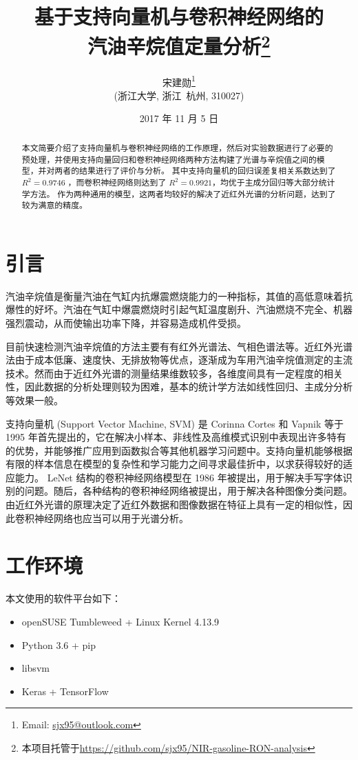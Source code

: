 \documentclass[a4paper]{article}
\title{基于支持向量机与卷积神经网络的\\汽油辛烷值定量分析\footnote{本项目托管于\url{https://github.com/sjx95/NIR-gasoline-RON-analysis}}}
\author{宋建勋\thanks{Email: \href{mailto:sjx95@outlook.com}{sjx95@outlook.com}} \\ \small(浙江大学, 浙江~杭州, 310027)}
\date{\small 2017 年 11 月 5 日}
\begin{document}
	\maketitle
	
	\begin{abstract}
		本文简要介绍了支持向量机与卷积神经网络的工作原理，然后对实验数据进行了必要的预处理，并使用支持向量回归和卷积神经网络两种方法构建了光谱与辛烷值之间的模型，并对两者的结果进行了评价与分析。
		其中支持向量机的回归误差复相关系数达到了 $R^2=0.9746$ ，而卷积神经网络则达到了 $R^2=0.9921$，均优于主成分回归等大部分统计学方法。
		作为两种通用的模型，这两者均较好的解决了近红外光谱的分析问题，达到了较为满意的精度。
	\end{abstract}
	
	
	\section{引言}
		汽油辛烷值是衡量汽油在气缸内抗爆震燃烧能力的一种指标，其值的高低意味着抗爆性的好坏。汽油在气缸中爆震燃烧时引起气缸温度剧升、汽油燃烧不完全、机器强烈震动，从而使输出功率下降，并容易造成机件受损。
		
		目前快速检测汽油辛烷值的方法主要有有红外光谱法、气相色谱法等。近红外光谱法由于成本低廉、速度快、无排放物等优点，逐渐成为车用汽油辛烷值测定的主流技术。然而由于近红外光谱的测量结果维数较多，各维度间具有一定程度的相关性，因此数据的分析处理则较为困难，基本的统计学方法如线性回归、主成分分析等效果一般。
		
		支持向量机 (Support Vector Machine, SVM) 是 Corinna Cortes 和 Vapnik 等于 1995 年首先提出的，它在解决小样本、非线性及高维模式识别中表现出许多特有的优势，并能够推广应用到函数拟合等其他机器学习问题中。支持向量机能够根据有限的样本信息在模型的复杂性和学习能力之间寻求最佳折中，以求获得较好的适应能力。
		LeNet 结构的卷积神经网络模型在 1986 年被提出，用于解决手写字体识别的问题。随后，各种结构的卷积神经网络被提出，用于解决各种图像分类问题。由近红外光谱的原理决定了近红外数据和图像数据在特征上具有一定的相似性，因此卷积神经网络也应当可以用于光谱分析。
		
	\section{工作环境}
		\noindent 本文使用的软件平台如下：
		
		\begin{itemize}
			\item openSUSE Tumbleweed + Linux Kernel 4.13.9
			\item Python 3.6 + pip
			\item libsvm
			\item Keras + TensorFlow
		\end{itemize}
	
\end{document}
